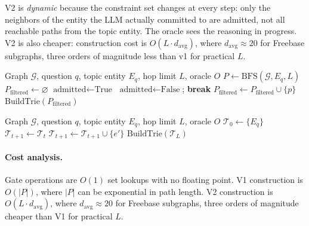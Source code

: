 \documentclass[11pt,twoside]{article}
\begin{document}
V2 is \emph{dynamic} because the constraint set changes at every step: only the neighbors of the entity the LLM actually committed to are admitted, not all reachable paths from the topic entity. The oracle sees the reasoning in progress. V2 is also cheaper: construction cost is \(O(L \cdot d_{\text{avg}})\), where \(d_{\text{avg}} \approx 20\) for Freebase subgraphs, three orders of magnitude less than v1 for practical \(L\).

\begin{algorithm}[H]
	\caption{Static ontology filtering}
	\begin{algorithmic}[1]
		\Require Graph \(\mathcal{G}\), question \(q\), topic entity \(E_q\), hop limit \(L\), oracle \(O\)
		\State \(P \gets \text{BFS}(\mathcal{G}, E_q, L)\)
		\State \(P_{\text{filtered}} \gets \varnothing\)
		\State \(\text{admitted} \gets \text{True}\)
		\State \(\text{admitted} \gets \text{False}\); \textbf{break}
		\EndIf
		\EndFor
		\State \(P_{\text{filtered}} \gets P_{\text{filtered}} \cup \{p\}\)
		\EndIf
		\EndFor
		\State \Return \(\text{BuildTrie}(P_{\text{filtered}})\)
	\end{algorithmic}
\end{algorithm}

\begin{algorithm}[H]
	\caption{Dynamic stepwise expansion}
	\begin{algorithmic}[1]
		\Require Graph \(\mathcal{G}\), question \(q\), topic entity \(E_q\), hop limit \(L\), oracle \(O\)
		\State \(\mathcal{T}_0 \gets \{E_q\}\)
		\State \(\mathcal{T}_{t+1} \gets \mathcal{T}_t\)
		\State \(\mathcal{T}_{t+1} \gets \mathcal{T}_{t+1} \cup \{e'\}\)
		\EndIf
		\EndFor
		\EndFor
		\State \Return \(\text{BuildTrie}(\mathcal{T}_L)\)
	\end{algorithmic}
\end{algorithm}

\paragraph{Cost analysis.}
Gate operations are \(O(1)\) set lookups with no floating point. V1 construction is \(O(|P|)\), where \(|P|\) can be exponential in path length. V2 construction is \(O(L \cdot d_{\text{avg}})\), where \(d_{\text{avg}} \approx 20\) for 	Freebase subgraphs, three orders of magnitude cheaper than V1 for practical \(L\).
\end{document}
